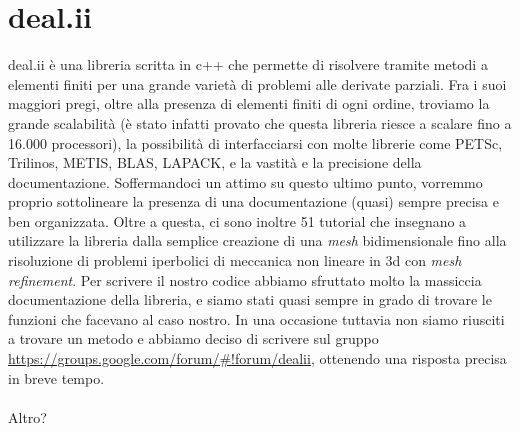 \documentclass[a4paper,10pt]{report}
\theoremstyle{plain}
\theoremstyle{definition}
\theoremstyle{remark}
\begin{document}
\section{\textsf{deal.ii}}
\textsf{deal.ii} \`e una libreria scritta in c++ che permette di risolvere tramite metodi a elementi finiti per una grande variet\`a di problemi alle derivate parziali. Fra i suoi maggiori pregi, oltre alla presenza di elementi finiti di ogni ordine, troviamo la grande scalabilit\`a (\`e stato infatti provato che questa libreria riesce a scalare fino a 16.000 processori), la possibilit\`a di interfacciarsi con molte librerie come \textsf{PETSc}, \textsf{Trilinos}, \textsf{METIS}, \textsf{BLAS}, \textsf{LAPACK}, e la vastit\`a e la precisione della documentazione. Soffermandoci un attimo su questo ultimo punto, vorremmo proprio sottolineare la presenza di una documentazione (quasi) sempre precisa e ben organizzata. Oltre a questa, ci sono inoltre 51 tutorial che insegnano a utilizzare la libreria dalla semplice creazione di una \emph{mesh} bidimensionale fino alla risoluzione di problemi iperbolici di meccanica non lineare in 3d con \emph{mesh refinement}. Per scrivere il nostro codice abbiamo sfruttato molto la massiccia documentazione della libreria, e siamo stati quasi sempre in grado di trovare le funzioni che facevano al caso nostro. In una occasione tuttavia non siamo riusciti a trovare un metodo e abbiamo deciso di scrivere sul gruppo \url{https://groups.google.com/forum/#!forum/dealii}, ottenendo una risposta precisa in breve tempo.\\\\Altro?
\end{document}
